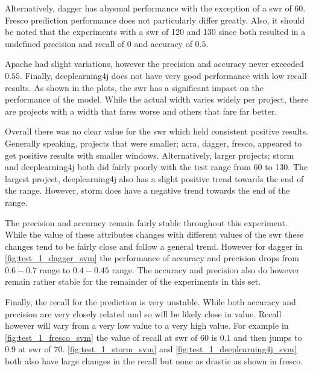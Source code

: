 Alternatively, dagger has abysmal performance with the exception of a \gls{swr} of 60. Fresco prediction performance does not particularly differ greatly. Also, it should be noted that the experiments with a \gls{swr} of 120 and 130 since both resulted in a undefined precision and recall of 0 and accuracy of $0.5$.

Apache had slight variations, however the precision and accuracy never exceeded $0.55$. Finally, deeplearning4j does not have very good performance with low recall results. As shown in the plots, the \gls{swr} has a significant impact on the performance of the model. While the actual width varies widely per project, there are projects with a width that fares worse and others that fare far better.

Overall there was no clear value for the \gls{swr} which held consistent positive results. Generally speaking, projects that were smaller; acra, dagger, fresco, appeared to get positive results with smaller windows. Alternatively, larger projects; storm and deeplearning4j both did fairly poorly with the test range from 60 to 130. The largest project, deeplearning4j also has a slight positive trend towards the end of the range. However, storm does have a negative trend towards the end of the range.

The precision and accuracy remain fairly stable throughout this experiment. While the value of these attributes changes with different values of the \gls{swr} these changes tend to be fairly close and follow a general trend. However for dagger in \autoref{fig:test_1_dagger_svm} the performance of accuracy and precision drops from $0.6 - 0.7$ range to $0.4 - 0.45$ range. The accuracy and precision also do however remain rather stable for the remainder of the experiments in this set.

Finally, the recall for the prediction is very unstable. While both accuracy and precision are very closely related and so will be likely close in value. Recall however will vary from a very low value to a very high value. For example in \autoref{fig:test_1_fresco_svm} the value of recall at \gls{swr} of $60$ is $0.1$ and then jumps to $0.9$ at \gls{swr} of $70$. \autoref{fig:test_1_storm_svm} and \autoref{fig:test_1_deeplearning4j_svm} both also have large changes in the recall but none as drastic as shown in fresco. 


